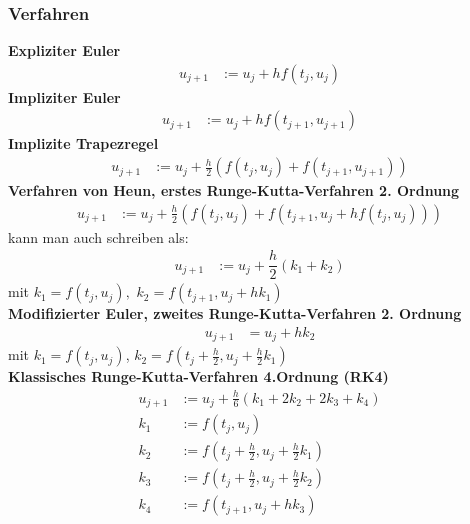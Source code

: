 \documentclass[
	ngerman,
	accentcolor=9c,%
	type=intern,
	marginpar=false
	]{tudapub}
\begin{document}
        \subsubsection{Verfahren}
            \textbf{Expliziter Euler}
            \begin{align*}
                u_{j+1} &:= u_j + hf(t_j,u_j)
            \end{align*}
            \textbf{Impliziter Euler}
            \begin{align*}
                u_{j+1} &:= u_j + hf(t_{j+1}, u_{j+1})
            \end{align*}
            \textbf{Implizite Trapezregel}
            \begin{align*}
                u_{j+1} &:= u_{j} + \frac{h}{2}(f(t_j,u_j)+f(t_{j+1},u_{j+1}))
            \end{align*}
            \textbf{Verfahren von Heun, erstes Runge-Kutta-Verfahren 2. Ordnung}
            \begin{align*}
                u_{j+1} & := u_j + \frac{h}{2}(f(t_j, u_j) + f(t_{j+1} , u_j + hf(t_j, u_j)))
            \end{align*}
            kann man auch schreiben als:
            \begin{align*}
                u_{j+1} &:= u_j + \dfrac{h}{2} (k_1 + k_2) 
            \end{align*}
            mit $k_1 = f(t_j, u_j),$  $k_2 = f(t_{j+1} , u_j + hk_1) $\\
            \textbf{Modifizierter Euler, zweites Runge-Kutta-Verfahren 2. Ordnung}
            \begin{align*}
                u_{j+1} &= u_j + hk_2
            \end{align*}
            mit $k_1 = f(t_j, u_j)$, $k_2 = f(t_j + \frac{h}{2}, u_j + \frac{h}{2}k_1)$\\
            \textbf{Klassisches Runge-Kutta-Verfahren  4.Ordnung (RK4)}
            \begin{align*}
                u_{j+1} &:= u_j + \frac{h}{6}(k_1 + 2k_2 + 2k_3 + k_4)\\
                k_1 &:= f(t_j, u_j)\\
                k_2 &:= f(t_j + \frac{h}{2}, u_j + \frac{h}{2}k_1)\\
                k_3 &:= f(t_j + \frac{h}{2}, u_j + \frac{h}{2}k_2)\\
                k_4 &:= f(t_{j+1}, u_j + hk_3)\\
            \end{align*}
\end{document}
